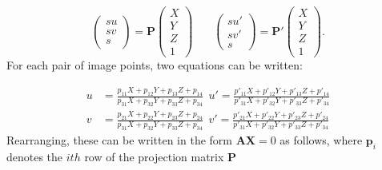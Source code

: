 \documentclass[11pt]{report}
\newcommand{\vect}[1]{\mathbf{#1}}
\begin{document}
\begin{equation}
\left(\!
    \begin{array}{c}
      su \\
      sv \\
      s
    \end{array}
  	\!\right) = \vect{P}
  	\left(\!
    \begin{array}{c}
      X \\
      Y \\
      Z \\
      1
    \end{array}
  	\!\right) 
  	\ \ \ \ \ \ \ \ 
\left(\!
    \begin{array}{c}
      su' \\
      sv' \\
      s
    \end{array}
  	\!\right) = \vect{P'}
  	\left(\!
    \begin{array}{c}
      X \\
      Y \\
      Z \\
      1
    \end{array}
  	\!\right).
\end{equation}
For each pair of image points, two equations can be written:

\begin{align*}
u &= \frac{p_{11}X + p_{12}Y + p_{13}Z + p_{14}}{p_{31}X + p_{32}Y + p_{33}Z + p_{34}} \ \  
u' = \frac{p'_{11}X + p'_{12}Y + p'_{13}Z + p'_{14}}{p'_{31}X + p'_{32}Y + p'_{33}Z + p'_{34}}\\ 
v &= \frac{p_{21}X + p_{22}Y + p_{23}Z + p_{24}}{p_{31}X + p_{32}Y + p_{33}Z + p_{34}} \ \ 
v' = \frac{p'_{21}X + p'_{22}Y + p'_{23}Z + p'_{24}}{p'_{31}X + p'_{32}Y + p'_{33}Z + p'_{34}}
\end{align*}
Rearranging, these can be written in the form $\vect{AX} = 0$ as follows, where $\vect{p}_i$ denotes the $ith$ row of the projection matrix $\vect{P}$
\end{document}
